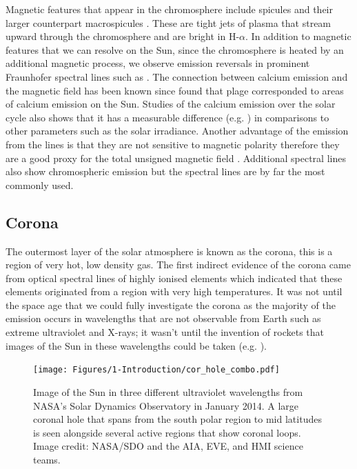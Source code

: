 Magnetic features that appear in the chromosphere include spicules \citep{Roberts_1945} and their larger counterpart macrospicules \citep{Bohlin_etal_1975}. These are tight jets of plasma that stream upward through the chromosphere and are bright in H-$\alpha$. In addition to magnetic features that we can resolve on the Sun, since the chromosphere is heated by an additional magnetic process, we observe emission reversals in prominent Fraunhofer spectral lines such as \caII. The connection between calcium emission and the magnetic field has been known since \citet{Leighton_1959} found that plage corresponded to areas of calcium emission on the Sun. Studies of the calcium emission over the solar cycle also shows that it has a measurable difference (e.g. \citealt{White_Livingston_1981}) in comparisons to other parameters such as the solar irradiance. Another advantage of the emission from the \caII lines is that they are not sensitive to magnetic polarity therefore they are a good proxy for the total unsigned magnetic field \citep{Linsky_Avrett_1970}. Additional spectral lines also show chromospheric emission but the \caII spectral lines are by far the most commonly used.

 \subsection{Corona}
The outermost layer of the solar atmosphere is known as the corona, this is a region of very hot, low density gas. The first indirect evidence of the corona came from optical spectral lines of highly ionised elements \citep{Grotrian_1939} which indicated that these elements originated from a region with very high temperatures. It was not until the space age that we could fully investigate the corona as the majority of the emission occurs in wavelengths that are not observable from Earth such as extreme ultraviolet and X-rays; it wasn't until the invention of rockets that images of the Sun in these wavelengths could be taken (e.g. \citealt{van_Speybroeck_etal_1970}).

\begin{figure}
    \centering
    \texttt{[image: Figures/1-Introduction/cor\_hole\_combo.pdf]}
    \caption[UV image of Sun showing coronal features]{Image of the Sun in three different ultraviolet wavelengths from NASA's Solar Dynamics Observatory in January 2014. A large coronal hole that spans from the south polar region to mid latitudes is seen alongside several active regions that show coronal loops. Image credit: NASA/SDO and the AIA, EVE, and HMI science teams.}
    \label{fig:corona_structure}
\end{figure}

